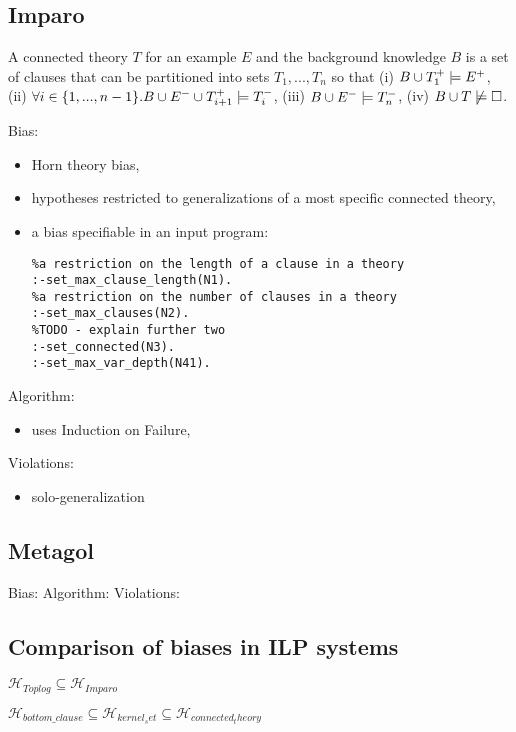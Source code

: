 \subsection{Imparo}
\begin{defn}
A connected theory $T$ for an example $E$ and the background knowledge $B$ is a set of clauses that can be partitioned into sets $T_1, ..., T_n$ so that
(i) $B \cup T_1^+ \models E^+$,
(ii) $\forall i \in \{1, ..., n-1\}. B \cup E^- \cup T_{i+1}^+ \models T_i^-$,
(iii) $B \cup E^- \models T_n^-$,
(iv) $B \cup T \not\models \square$.

\end{defn}
Bias:
\begin{itemize}
\item Horn theory bias,
\item hypotheses restricted to generalizations of a most specific connected theory,
\item a bias specifiable in an input program:
\begin{lstlisting}
%a restriction on the length of a clause in a theory
:-set_max_clause_length(N1).
%a restriction on the number of clauses in a theory
:-set_max_clauses(N2).
%TODO - explain further two
:-set_connected(N3).
:-set_max_var_depth(N41).
\end{lstlisting}
\end{itemize}
Algorithm:
\begin{itemize}
\item uses Induction on Failure,

\end{itemize}
Violations:


\begin{itemize}
\item solo-generalization
\end{itemize}

\subsection{Metagol}
Bias:
Algorithm:
Violations:

\subsection{Comparison of biases in ILP systems}
$\mathcal{H}_{Toplog} \subseteq \mathcal{H}_{Imparo}$

$\mathcal{H}_{bottom\_clause} \subseteq \mathcal{H}_{kernel_set} \subseteq \mathcal{H}_{connected_theory}$

